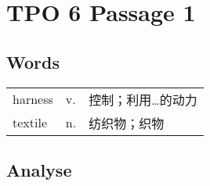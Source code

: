 \section{TPO 6 Passage 1}

\subsection{Words}

\begin{tabular}{lll}
    harness & v. & 控制；利用…的动力 \\
    textile & n. & 纺织物；织物    \\
\end{tabular}

\subsection{Analyse}

